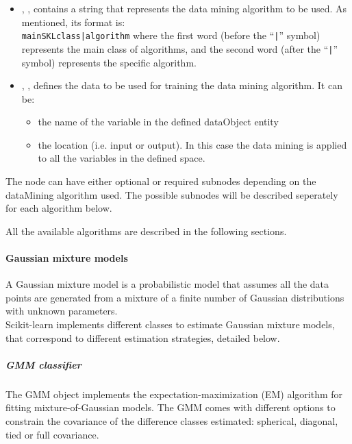 \begin{itemize}
  \item {}, , contains a string that represents the data mining algorithm
  to be used.
  As mentioned, its format is:\\
  \texttt{mainSKLclass|algorithm} where the
  first word (before the ``\texttt{|}'' symbol) represents the main class of
  algorithms, and the second word (after the ``\texttt{|}'' symbol) represents
  the specific algorithm.
  \item {}, , defines the data
  to be used for training the data mining algorithm. It can be:
  \begin{itemize}
	\item the name of the variable in the defined dataObject entity
	\item the location (i.e. input or output). In this case the data mining
        is applied to all the variables in the defined space.
  \end{itemize}
\end{itemize}

The  node can have either optional or required subnodes depending
 on the dataMining algorithm used. The possible subnodes will be described seperately
 for each algorithm below.

All the available algorithms are described in the following sections.

\paragraph{Gaussian mixture models}
\label{paragraph:GMM}

A Gaussian mixture model is a probabilistic model that assumes all
 the data points are generated from a mixture of a finite number of
 Gaussian distributions with unknown parameters.
\\
Scikit-learn implements different classes to estimate Gaussian
mixture models, that correspond to different estimation strategies,
 detailed below.

\subparagraph{ GMM classifier} \hfill
\label{subparagraph:GMMClass}

The GMM object implements the expectation-maximization (EM)
algorithm for fitting mixture-of-Gaussian models. The GMM comes with different options
 to constrain the covariance of  the difference classes estimated: spherical, diagonal, tied or
 full covariance.

